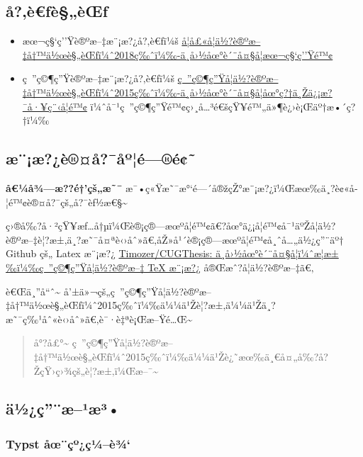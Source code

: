 \subsection{å?‚è€ƒè§„èŒƒ}\label{uxe5uxe8ux192uxe8uxe8ux153ux192}

\begin{itemize}
\tightlist
\item
  æœ¬ç§`ç''Ÿè®ºæ--‡æ¨¡æ?¿å?‚è€ƒï¼š
  \href{https://bksy.cug.edu.cn/info/1489/1851.htm}{å­¦å£«å­¦ä½?è®ºæ--‡å†™ä½œè§„èŒƒï¼ˆ2018ç‰ˆï¼‰-ä¸­å›½åœ°è´¨å¤§å­¦æœ¬ç§`ç''Ÿé™¢}
\item
  ç~''ç©¶ç''Ÿè®ºæ--‡æ¨¡æ?¿å?‚è€ƒï¼š
  \href{https://xgxy.cug.edu.cn/info/1073/3509.htm}{ç~''ç©¶ç''Ÿå­¦ä½?è®ºæ--‡å†™ä½œè§„èŒƒï¼ˆ2015ç‰ˆï¼‰-ä¸­å›½åœ°è´¨å¤§å­¦åœ°ç?†ä¸Žä¿¡æ?¯å·¥ç¨‹å­¦é™¢}
  ï¼ˆå¯¹ç~''ç©¶ç''Ÿé™¢ç›¸å\ldots³é€šçŸ¥é™„ä»¶è¿›è¡Œäº†æ•´ç?†ï¼‰
\end{itemize}

\subsection{æ¨¡æ?¿è®¤å?¯åº¦é---®é¢˜}\label{uxe6uxe6uxe8uxe5uxe5uxbauxe9uxe9}

\textbf{å€¼å¾---æ??é†'çš„æ˜¯}
æ¯•ç«Ÿæ˜¯æ°`é---´å®žçŽ°æ¨¡æ?¿ï¼Œæœ‰ä¸?è¢«å­¦é™¢è®¤å?¯çš„å?¯èƒ½æ€§\textasciitilde{}

ç›®å‰?å·²çŸ¥æƒ\ldots å†µï¼Œè®¡ç®---æœºå­¦é™¢ã€?åœ°ä¿¡å­¦é™¢å¯¹äºŽå­¦ä½?è®ºæ--‡è¦?æ±‚ä¸?æ˜¯å¤ªè‹›åˆ»ã€‚åŽ»å¹´è®¡ç®---æœºå­¦é™¢å¸ˆå\ldots„ä½¿ç''¨äº†
Github çš„ Latex æ¨¡æ?¿
\href{https://github.com/Timozer/CUGThesis}{Timozer/CUGThesis:
ä¸­å›½åœ°è´¨å¤§å­¦ï¼ˆæ­¦æ±‰ï¼‰ç~''ç©¶ç''Ÿå­¦ä½?è®ºæ--‡ TeX æ¨¡æ?¿}
å®Œæˆ?å­¦ä½?è®ºæ--‡ã€‚

è€Œä¸''å``ˆ\textasciitilde{}
å'±ä»¬çš„ç~''ç©¶ç''Ÿå­¦ä½?è®ºæ--‡å†™ä½œè§„èŒƒï¼ˆ2015ç‰ˆï¼‰ä¼¼ä¹Žè¦?æ±‚ä¼¼ä¹Žä¸?æ˜¯ç‰¹åˆ«è‹›åˆ»ã€‚è¯·è‡ªè¡Œæ--Ÿé\ldots Œ\textasciitilde{}

\begin{quote}
å°?å£°\textasciitilde{}
ç~''ç©¶ç''Ÿå­¦ä½?è®ºæ--‡å†™ä½œè§„èŒƒï¼ˆ2015ç‰ˆï¼‰ä¼¼ä¹Žè¿˜æœ‰ä¸€å¤„å‰?å?ŽçŸ›ç›¾çš„è¦?æ±‚ï¼Œæ--¯\textasciitilde{}
\end{quote}

\subsection{ä½¿ç''¨æ--¹æ³•}\label{uxe4uxbduxe7uxe6uxb9uxe6uxb3}

\subsubsection{Typst
åœ¨çº¿ç¼--è¾`}\label{typst-uxe5ux153uxe7uxbauxe7uxbcuxe8uxbe}

